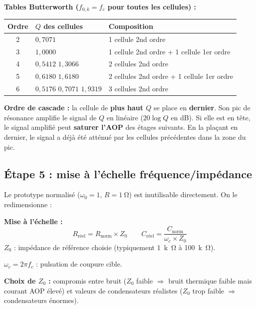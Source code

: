 \documentclass[12pt,a4paper,twoside]{book}
\begin{document}
\begin{formule}
\textbf{Tables Butterworth ($f_{0,k} = f_c$ pour toutes les cellules) :}

\begin{center}
\begin{tabular}{cll}
\toprule
\textbf{Ordre} & \textbf{$Q$ des cellules} & \textbf{Composition} \\
\midrule
2 & $0{,}7071$ & 1 cellule 2nd ordre \\
3 & $1{,}0000$ & 1 cellule 2nd ordre + 1 cellule 1er ordre \\
4 & $0{,}5412$ \quad $1{,}3066$ & 2 cellules 2nd ordre \\
5 & $0{,}6180$ \quad $1{,}6180$ & 2 cellules 2nd ordre + 1 cellule 1er ordre \\
6 & $0{,}5176$ \quad $0{,}7071$ \quad $1{,}9319$ & 3 cellules 2nd ordre \\
\bottomrule
\end{tabular}
\end{center}
\end{formule}

\begin{attention}
\textbf{Ordre de cascade :} la cellule de \textbf{plus haut $Q$} se place en \textbf{dernier}. Son pic de résonance amplifie le signal de $Q$ en linéaire ($20\log Q$ en dB). Si elle est en tête, le signal amplifié peut \textbf{saturer l'AOP} des étages suivants. En la plaçant en dernier, le signal a déjà été atténué par les cellules précédentes dans la zone du pic.
\end{attention}

\subsection{Étape 5 : mise à l'échelle fréquence/impédance}

Le prototype normalisé ($\omega_0 = 1$, $R = \SI{1}{\ohm}$) est inutilisable directement. On le redimensionne :

\begin{formule}
\textbf{Mise à l'échelle :}
\[
\boxed{R_{\text{réel}} = R_{\text{norm}} \times Z_0} \qquad \boxed{C_{\text{réel}} = \frac{C_{\text{norm}}}{\omega_c \times Z_0}}
\]
$Z_0$ : impédance de référence choisie (typiquement \SI{1}{k\ohm} à \SI{100}{k\ohm}).

$\omega_c = 2\pi f_c$ : pulsation de coupure cible.

\textbf{Choix de $Z_0$ :} compromis entre bruit ($Z_0$ faible $\Rightarrow$ bruit thermique faible mais courant AOP élevé) et valeurs de condensateurs réalistes ($Z_0$ trop faible $\Rightarrow$ condensateurs énormes).
\end{formule}
\end{document}
